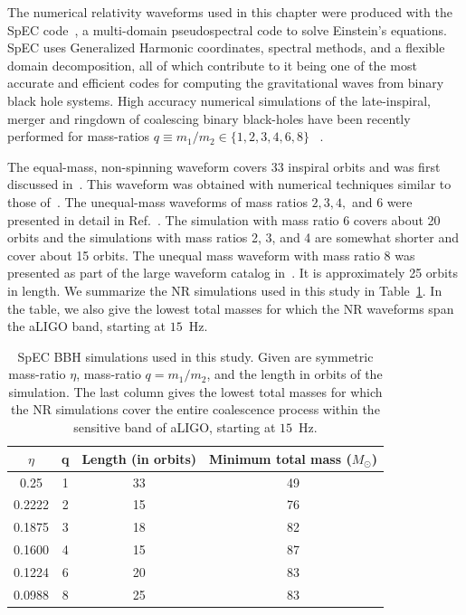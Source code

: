 The numerical relativity waveforms used in this chapter were produced
with the SpEC code~\cite{spec}, a multi-domain pseudospectral code to solve
Einstein's equations. SpEC uses Generalized Harmonic coordinates,
spectral methods, and a flexible domain decomposition, all of which
contribute to it being one of the most accurate and efficient codes
for computing the gravitational waves from binary black hole
systems. High accuracy numerical simulations of the late-inspiral,
merger and ringdown  of coalescing binary black-holes have been
recently performed for mass-ratios $q\equiv m_1/m_2\in\{1,2,3,4,6,8\}$
~\cite{Buchman:2012dw,Scheel:2008rj,NRPNComparisonBoyleetal,Mroue:2012kv}.

The equal-mass,
non-spinning waveform covers 33 inspiral orbits and was first discussed
in~\cite{MacDonald:2012mp,Mroue:2012kv}. 
This waveform was obtained with numerical techniques similar to those 
of~\cite{Buchman:2012dw}. The unequal-mass waveforms of mass ratios 
$2, 3, 4,$ and $6$ were presented in detail in Ref.~\cite{Buchman:2012dw}.
The simulation with mass ratio $6$ covers about 20 orbits and the
simulations with mass ratios 2, 3, and 4 are somewhat shorter and
cover about 15 orbits. The unequal mass waveform with mass ratio 8 was
presented as part of the large waveform catalog
in~\cite{Mroue:2013xna,Mroue:2012kv}. It is approximately 25 orbits in
length. 
We summarize the NR simulations used in this study in 
Table~\ref{table:etalist4}. In the table, we also give the  
lowest total masses for which the NR waveforms span the aLIGO 
band, starting at $15$~Hz.

\begin{table}
\begin{tabular}{| c | c | c | c |}
\hline
$\hspace{10pt}\eta\hspace{10pt}$ & \hspace{15pt} q\hspace{15pt} & Length (in orbits) & Minimum total mass ($M_\odot$)\\ \hline
0.25 & 1 & 33 & 49 \\
0.2222 & 2 & 15 & 76 \\
0.1875 & 3 & 18 & 82 \\
0.1600 & 4 & 15 & 87 \\
0.1224 & 6 & 20 & 83 \\
0.0988 & 8 & 25 & 83 \\
\hline
\end{tabular}
\caption{SpEC BBH simulations used in this study.  Given are symmetric mass-ratio $\eta$, mass-ratio $q=m_1/m_2$, and the length in orbits of the simulation. 
The last column gives the lowest total masses for which the NR simulations 
cover the entire coalescence process within the sensitive band of aLIGO,
starting at $15$~Hz.}
\label{table:etalist4}
\end{table}

